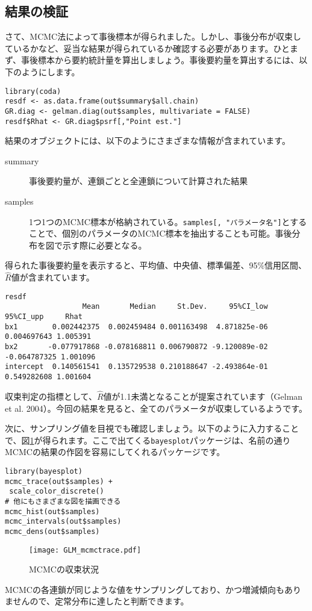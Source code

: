 \subsection{結果の検証}
さて、MCMC法によって事後標本が得られました。しかし、事後分布が収束しているかなど、妥当な結果が得られているか確認する必要があります。ひとまず、事後標本から要約統計量を算出しましょう。事後要約量を算出するには、以下のようにします。
\begin{verbatim}
library(coda)
resdf <- as.data.frame(out$summary$all.chain)
GR.diag <- gelman.diag(out$samples, multivariate = FALSE)
resdf$Rhat <- GR.diag$psrf[,"Point est."]
\end{verbatim}
結果のオブジェクトには、以下のようにさまざまな情報が含まれています。
\begin{description}
  \item[summary]事後要約量が、連鎖ごとと全連鎖について計算された結果
  \item[samples]1つ1つのMCMC標本が格納されている。\verb|samples[, "パラメータ名"]|とすることで、個別のパラメータのMCMC標本を抽出することも可能。事後分布を図で示す際に必要となる。
\end{description}


得られた事後要約量を表示すると、平均値、中央値、標準偏差、95\%信用区間、$\hat{R}$値が含まれています。
\begin{verbatim}
resdf
                  Mean       Median     St.Dev.     95%CI_low    95%CI_upp     Rhat
bx1        0.002442375  0.002459484 0.001163498  4.871825e-06  0.004697643 1.005391
bx2       -0.077917868 -0.078168811 0.006790872 -9.120089e-02 -0.064787325 1.001096
intercept  0.140561541  0.135729538 0.210188647 -2.493864e-01  0.549282608 1.001604
\end{verbatim}
収束判定の指標として、$\hat{R}$値が1.1未満となることが提案されています（Gelman et al. 2004）。今回の結果を見ると、全てのパラメータが収束しているようです。

次に、サンプリング値を目視でも確認しましょう。以下のように入力することで、図\ref{GLM_mcmctrace}が得られます。ここで出てくる\texttt{bayesplot}パッケージは、名前の通りMCMCの結果の作図を容易にしてくれるパッケージです。
\begin{verbatim}
library(bayesplot)
mcmc_trace(out$samples) +
 scale_color_discrete()
# 他にもさまざまな図を描画できる
mcmc_hist(out$samples)
mcmc_intervals(out$samples)
mcmc_dens(out$samples)
\end{verbatim}
\begin{figure}[htb]
\begin{center}
\graphicspath{{3_glm/figs/}}
\texttt{[image: GLM\_mcmctrace.pdf]}\\
\caption{MCMCの収束状況}
\label{GLM_mcmctrace}
\end{center}
\end{figure}
MCMCの各連鎖が同じような値をサンプリングしており、かつ増減傾向もありませんので、定常分布に達したと判断できます。

